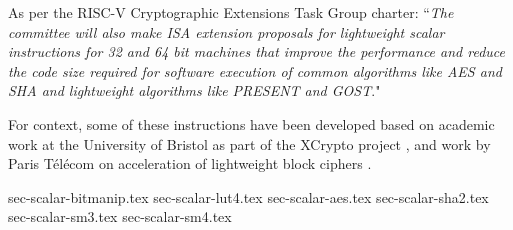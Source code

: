 
As per the RISC-V Cryptographic Extensions Task Group charter:
``{\em The committee will also make ISA extension proposals for lightweight
scalar instructions for 32 and 64 bit machines that improve the performance
and reduce the code size required for software execution of common algorithms
like AES and SHA and lightweight algorithms like PRESENT and GOST}."

\bigskip

For context, some of these instructions have been developed based on academic
work at the University of Bristol as part of the XCrypto project
\cite{MPP:19},
and work by
Paris T\'{e}l\'{e}com on acceleration of lightweight block ciphers
\cite{TGMGD:19}.



{sec-scalar-bitmanip.tex}
{sec-scalar-lut4.tex}
{sec-scalar-aes.tex}
{sec-scalar-sha2.tex}
{sec-scalar-sm3.tex}
{sec-scalar-sm4.tex}


